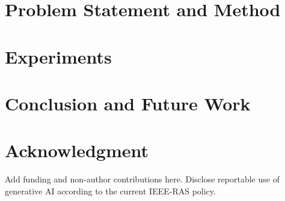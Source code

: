 \documentclass[letterpaper,10pt,conference]{ieeeconf}
\newif\ificraanonymous
\begin{document}
\section{Problem Statement and Method}
\label{sec:method}


\section{Experiments}
\label{sec:experiments}


\section{Conclusion and Future Work}
\label{sec:conclusion}


% 

\ificraanonymous
\else
  \section*{Acknowledgment}
  Add funding and non-author contributions here. Disclose reportable use of
  generative AI according to the current IEEE-RAS policy.
\fi

{\small
  
  
}
\end{document}
